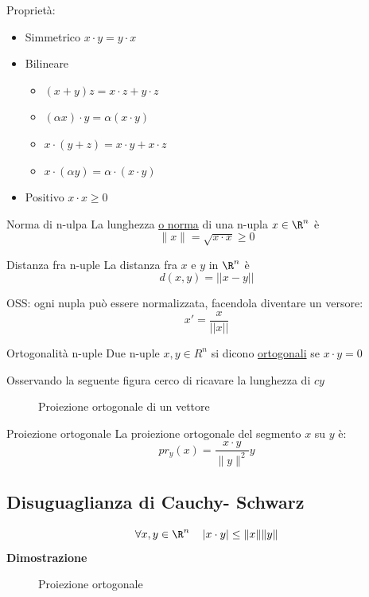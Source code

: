 Proprietà:
\begin{itemize}
	\item Simmetrico \quad $x\cdot y = y \cdot x$
	\item Bilineare
	      \begin{itemize}
		      \item $(x+y)z = x \cdot z + y \cdot z$
		      \item $\left( \alpha x  \right) \cdot y = \alpha \left( x \cdot y \right) $
		      \item $x \cdot \left(  y + z \right)  = x \cdot y + x \cdot z$
		      \item $x \cdot \left( \alpha y  \right) = \alpha \cdot \left( x \cdot y \right) $
	      \end{itemize}
	\item Positivo \quad $ x \cdot x \ge 0$
\end{itemize}

\begin{definizione}{Norma di n-ulpa}
	La lunghezza \underline{ o norma} di una n-upla $ x  \in \R ^{n}$ è \[
		\|x\|= \sqrt{x \cdot x} \ge 0
	\]
\end{definizione}

\begin{definizione}{Distanza fra n-uple}
	La distanza fra $x$ e $y$ in $ \R ^{n}$ è \[
		d\left( x, y  \right) = \left|\left|x-y\right|\right|
	\]
\end{definizione}

OSS: ogni nupla può essere normalizzata, facendola diventare un versore: \[
	x' = \frac{x}{\left|\left|x\right|\right|}
\]
\begin{definizione}{Ortogonalità n-uple}
	Due n-uple $ x, y  \in  R^{ n}$ si dicono \underline{ortogonali} se $ x \cdot y =0$
\end{definizione}
Osservando la seguente figura cerco di ricavare la lunghezza di $cy$
\begin{figure}[H]
	\centering
	
	\caption{Proiezione ortogonale di un vettore}
\end{figure}

\begin{definizione}{Proiezione ortogonale}
	La proiezione ortogonale del segmento $x$ su $y$ è:
	\[
		pr_y\left( x \right) = \frac{x \cdot y}{\|y\|^2} y
	\]
\end{definizione}

\subsection{Disuguaglianza di Cauchy- Schwarz}
\[
	\forall x, y  \in  \R ^{n} \quad \left|x \cdot y \right| \le \|x\| \| y\|
\]
\textbf{Dimostrazione}
\begin{figure}[h]
	\centering
	
	\caption{Proiezione ortogonale}
\end{figure}

